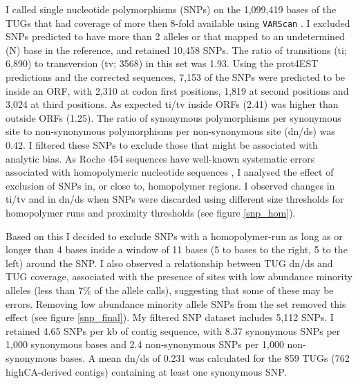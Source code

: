 I called single nucleotide polymorphisms (SNPs) on the 1,099,419 bases
of the TUGs that had coverage of more then 8-fold available using
\texttt{VARScan} \cite{pmid19542151}. I excluded SNPs predicted to
have more than 2 alleles or that mapped to an undetermined (N) base in
the reference, and retained 10,458 SNPs. The ratio of transitions (ti;
6,890) to transversion (tv; 3568) in this set was 1.93. Using the
prot4EST predictions and the corrected sequences, 7,153 of the SNPs
were predicted to be inside an ORF, with 2,310 at codon first
positions, 1,819 at second positions and 3,024 at third positions. As
expected ti/tv inside ORFs (2.41) was higher than outside ORFs
(1.25). The ratio of synonymous polymorphisms per synonymous site to
non-synonymous polymorphisms per non-synonymous site (dn/ds) was
0.42. I filtered these SNPs to exclude those that might be associated
with analytic bias. As Roche 454 sequences have well-known
systematic errors associated with homopolymeric nucleotide sequences
\cite{pmid21685085}, I analysed the effect of exclusion of SNPs in, or
close to, homopolymer regions. I observed changes in ti/tv and in
dn/ds when SNPs were discarded using different size thresholds for
homopolymer runs and proximity thresholds (see figure \ref{snp_hom}).


Based on this I decided to exclude SNPs with a homopolymer-run as long
as or longer than 4 bases inside a window of 11 bases (5 to bases to
the right, 5 to the left) around the SNP. I also observed a
relationship between TUG dn/ds and TUG coverage, associated with the
presence of sites with low abundance minority alleles (less than 7\%
of the allele calls), suggesting that some of these may be errors.
Removing low abundance minority allele SNPs from the set removed this
effect (see figure \ref{snp_final}). My filtered SNP dataset
includes 5,112 SNPs. I retained 4.65 SNPs per kb of contig sequence,
with 8.37 synonymous SNPs per 1,000 synonymous bases and 2.4
non-synonymous SNPs per 1,000 non-synonymous bases. A mean dn/ds of
0.231 was calculated for the 859 TUGs (762 highCA-derived contigs)
containing at least one synonymous SNP.

